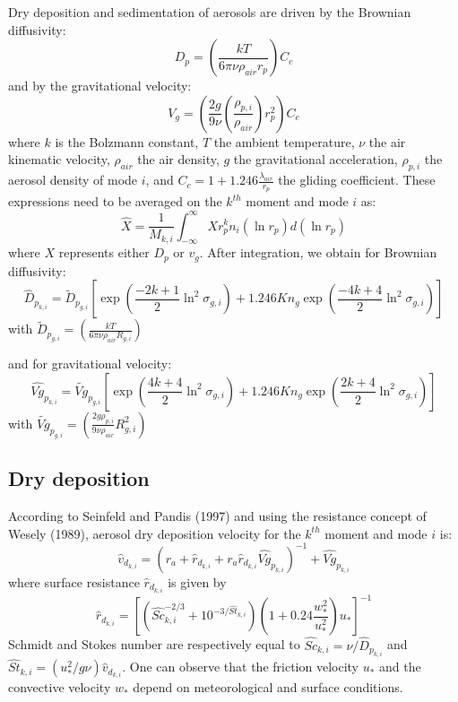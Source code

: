 Dry deposition and sedimentation of aerosols are driven by the Brownian 
diffusivity:
\begin{equation}
D_p = \left(\frac{k T}{6 \pi \nu \rho_{air} r_p} \right) C_c
\label{diff_bro}
\end{equation}
and by  the gravitational velocity:
\begin{equation}
V_g = \left(\frac{2 g}{9 \nu}\left(\frac{\rho_{p,i}}{\rho_{air}}\right) r_p^2 
\right) C_c
\label{vitesse_grav}
\end{equation}
where $k$ is the Bolzmann constant, $T$ the ambient temperature, $\nu$ the air 
kinematic velocity, $\rho_{air}$ the air density, $g$ the gravitational 
acceleration, $\rho_{p,i}$ the aerosol density of mode $i$, and $C_c = 1 + 
1.246\frac{\lambda_{air}}{r_p}$ the gliding coefficient. 
These expressions need to be averaged on the $k^{th}$ moment and mode $i$ as:
\begin{equation}
\hat{X} = \frac{1}{M_{k,i}} \int_{-\infty}^{\infty} X r^k_p n_i(\ln r_p)d(\ln r_p)
\label{moyenne}
\end{equation}
where $X$ represents either $D_p$ or $v_g$.
After integration, we obtain for  Brownian diffusivity:
\begin{equation}
\hat{D}_{p_{k,i}} = \tilde{D}_{p_{g,i}}\left[\exp\left(\frac{-2k+1}{2} 
\ln^2\sigma_{g,i} \right) + 1.246 Kn_g 
\exp \left(\frac{-4k+4}{2} \ln^2\sigma_{g,i}\right) \right]
\label{diff_brow}
\end{equation}
with $\tilde{D}_{p_{g,i}} = \left(\frac{kT}{6 \pi \nu \rho_{air} R_{g,i}} 
\right)$

and for gravitational velocity: 
\begin{equation}
\hat{Vg}_{p_{k,i}} = \tilde{Vg}_{p_{g,i}}\left[\exp\left(\frac{4k+4}{2} 
\ln^2\sigma_{g,i} \right) + 1.246 Kn_g \exp \left(\frac{2k+4}{2} 
\ln^2\sigma_{g,i}\right) \right]
\end{equation}
with $\tilde{Vg}_{p_{g,i}} = \left(\frac{2g \rho_{p,i}}{9 \nu \rho_{air}} 
R_{g,i}^2 \right)$

\subsection*{Dry deposition}
According to Seinfeld and Pandis (1997)\nocite{seinfeld1997} and using the resistance concept of 
Wesely (1989), aerosol dry deposition
velocity for the $k^{th}$ moment and mode $i$ is:
\begin{equation}
\hat{v}_{d_{k,i}} = ( r_a + \hat{r}_{d_{k,i}} + r_a  \hat{r}_{d_{k,i}} 
\hat{Vg}_{p_{k,i}})^{-1} + \hat{Vg}_{p_{k,i}}
\end{equation}
where surface resistance $\hat{r}_{d_{k,i}}$ is given by
\begin{equation}
\hat{r}_{d_{k,i}} = \left[(\hat{Sc}_{k,i}^{-2/3} + 10^{-3/\hat{St}_{k,i}}) 
\left(1+ 0.24 \frac{w_*^2}{u_*^2} \right) u_* \right]^{-1}
\label{surfres}
\end{equation}
Schmidt and Stokes number are respectively equal to $\hat{Sc}_{k,i} = \nu / 
\hat{D}_{p_{k,i}}$ and
$\hat{St}_{k,i}= (u_*^2/g\nu)\hat{v}_{d_{k,i}}$.
One can observe that the friction velocity $u_*$ and the convective velocity 
$w_*$ depend on meteorological
and surface conditions. 
